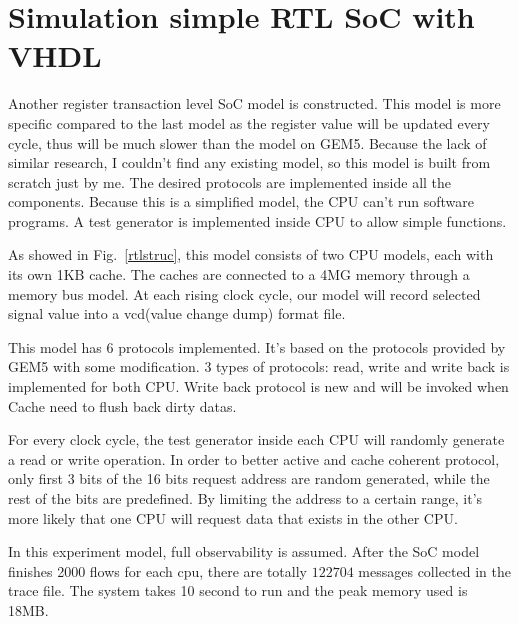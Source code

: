 \documentclass[12pt,frontmatter,copyright,thesis]{usfmanus}
\begin{document}
\section{Simulation simple RTL SoC with VHDL}
Another register transaction level SoC model is constructed. This model is more specific compared to the last model as the register value will be updated every cycle, thus will be much slower than the model on GEM5. Because the lack of similar research, I couldn't find any existing model, so this model is built from scratch just by me. The desired protocols are implemented inside all the components. Because this is a simplified model, the CPU can't run software programs. A test generator is implemented inside CPU to allow simple functions.

 As showed in Fig.~\ref{rtlstruc}, this model consists of two CPU models, each with its own 1KB cache. The caches are connected to a 4MG memory through a memory bus model. At each rising clock cycle, our model will record selected signal value into a vcd(value change dump) format file.

This model has 6 protocols implemented. It's based on the protocols provided by GEM5 with some modification. 3 types of protocols: read, write and write back is implemented for both CPU. Write back protocol is new and will be invoked when Cache need to flush back dirty datas.

For every clock cycle, the test generator inside each CPU will randomly generate a read or write operation. In order to better active and cache coherent protocol, only first 3 bits of the 16 bits request address are random generated, while the rest of the bits are predefined. By limiting the address to a certain range, it's more likely that one CPU will request data that exists in the other CPU.

In this experiment model, full observability is assumed.
After the SoC model finishes 2000 flows for each cpu, there
are totally $122704$ messages collected in the trace file.
The system takes 10 second to run and the peak memory used is 18MB.
\end{document}
